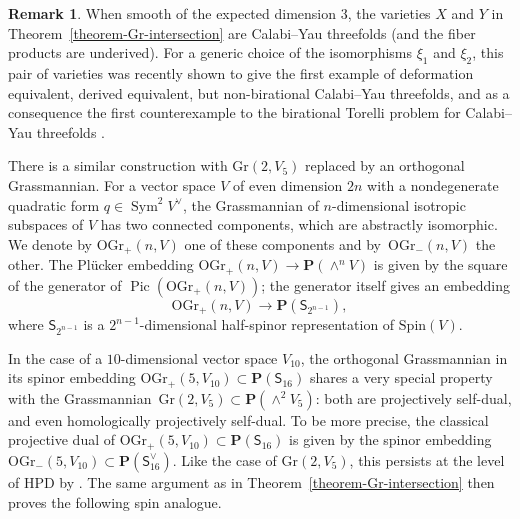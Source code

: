 \documentclass[11pt, reqno]{amsart}
\numberwithin{equation}{section}
\theoremstyle{plain}
\theoremstyle{definition}
\newtheorem{remark}[theorem]{Remark}
\newcommand{\svee}{\scriptscriptstyle\vee}
\newcommand{\Gr}{\mathrm{Gr}}
\newcommand{\OGrp}{\mathrm{OGr_+}}
\newcommand{\OGrm}{\mathrm{OGr_-}}
\newcommand{\Spin}{\mathrm{Spin}}
\DeclareMathOperator{\Sym}{Sym}
\DeclareMathOperator{\Pic}{Pic}
\newcommand{\vV}{V^{\svee}}
\newcommand{\bP}{\mathbf{P}}
\newcommand{\sS}{\mathsf{S}}
\newcommand{\sSs}{\mathsf{S}_{16}}
\begin{document}
\begin{remark}
When smooth of the expected dimension $3$, the varieties $X$ and $Y$ 
in Theorem~\ref{theorem-Gr-intersection} are Calabi--Yau threefolds (and the fiber products are underived). 
For a generic choice of the isomorphisms $\xi_1$ and $\xi_2$, this pair of varieties 
was recently shown to give the first example of deformation equivalent, 
derived equivalent, but non-birational Calabi--Yau threefolds, and as a consequence 
the first counterexample to the birational Torelli problem for Calabi--Yau threefolds
\cite{GPK3, jj-torelli}.  
\end{remark}


There is a similar construction with $\Gr(2,V_5)$ replaced by an orthogonal Grassmannian.
For a vector space $V$ of even dimension $2n$ with a  
nondegenerate quadratic form $q \in \Sym^2\vV$, the 
Grassmannian of $n$-dimensional isotropic subspaces of $V$ 
has two connected components, which are abstractly isomorphic. 
We denote by $\OGrp(n, V)$ one of these components and by~$\OGrm(n, V)$ the other. 
The Pl\"{u}cker embedding $\OGrp(n,V) \to \bP(\wedge^nV)$ is 
given by the square of the generator of $\Pic(\OGrp(n,V))$; the 
generator itself gives an embedding 
\begin{equation*}
\OGrp(n,V) \to \bP(\sS_{2^{n-1}}), 
\end{equation*}
where $\sS_{2^{n-1}}$ 
is a $2^{n-1}$-dimensional half-spinor representation of $\Spin(V)$. 

In the case of a $10$-dimensional vector space $V_{10}$, the orthogonal 
Grassmannian in its spinor embedding $\OGrp(5, V_{10}) \subset \bP(\sSs)$ 
shares a very special property with the Grassmannian~$\Gr(2, V_5) \subset \bP(\wedge^2V_5)$: both are projectively self-dual, 
and even homologically projectively self-dual.
To be more precise, the classical projective dual of $\OGrp(5, V_{10}) \subset \bP(\sSs)$ 
is given by the spinor embedding $\OGrm(5, V_{10}) \subset \bP(\sSs^{\svee})$. 
Like the case of $\Gr(2, V_5)$, this persists at the level of HPD 
by \cite[Section~6.2 and Theorem~1.2]{kuznetsov2006hyperplane}. 
The same argument as in Theorem~\ref{theorem-Gr-intersection} then proves the following 
spin analogue. 
\end{document}
